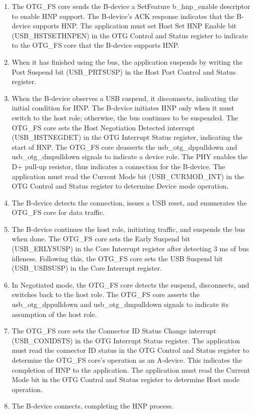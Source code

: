 \documentclass[main\_\_EN.tex]{subfiles}
\begin{document}
\begin{enumerate}
    \item The OTG\_FS core sends the B-device a SetFeature b\_hnp\_enable descriptor to enable HNP support. The B-device's ACK response indicates that the B-device supports HNP. The application must set Host Set HNP Enable bit (USB\_HSTSETHNPEN) in the OTG Control and Status register to indicate to the OTG\_FS core that the B-device supports HNP.
    \item When it has finished using the bus, the application suspends by writing the Port Suspend bit (USB\_PRTSUSP) in the Host Port Control and Status register.
    \item When the B-device observes a USB suspend, it disconnects, indicating the initial condition for HNP. The B-device initiates HNP only when it must switch to the host role; otherwise, the bus continues to be suspended. The OTG\_FS core sets the Host Negotiation Detected interrupt (USB\_HSTNEGDET) in the OTG Interrupt Status register, indicating the start of HNP. The OTG\_FS core deasserts the usb\_otg\_dppulldown and usb\_otg\_dmpulldown signals to indicate a device role. The PHY enables the D+ pull-up resistor, thus indicates a connection for the B-device. The application must read the Current Mode bit (USB\_CURMOD\_INT) in the OTG Control and Status register to determine Device mode operation.
    \item The B-device detects the connection, issues a USB reset, and enumerates the OTG\_FS core for data traffic.
    \item The B-device continues the host role, initiating traffic, and suspends the bus when done. The OTG\_FS core sets the Early Suspend bit (USB\_ERLYSUSP) in the Core Interrupt register after detecting 3 ms of bus idleness. Following this, the OTG\_FS core sets the USB Suspend bit (USB\_USBSUSP) in the Core Interrupt register.
    \item In Negotiated mode, the OTG\_FS core detects the suspend, disconnects, and switches back to the host role. The OTG\_FS core asserts the usb\_otg\_dppulldown and usb\_otg\_dmpulldown signals to indicate its assumption of the host role.
    \item The OTG\_FS core sets the Connector ID Status Change interrupt (USB\_CONIDSTS) in the OTG Interrupt Status register. The application must read the connector ID status in the OTG Control and Status register to determine the OTG\_FS core's operation as an A-device. This indicates the completion of HNP to the application. The application must read the Current Mode bit in the OTG Control and Status register to determine Host mode operation.
    \item The B-device connects, completing the HNP process.
\end{enumerate}
\end{document}
